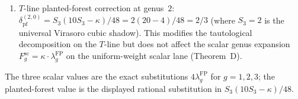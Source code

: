 \begin{computation}
\begin{enumerate}[label=\textup{(\roman*)}]
 tree-level and one-loop amplitudes explicitly.
\item $T$-line planted-forest correction at genus~$2$:
 $\delta_{\mathrm{pf}}^{(2,0)} = S_3(10S_3 - \kappa)/48
 = 2(20 - 4)/48 = 2/3$
 \textup{(}where $S_3 = 2$ is the universal Virasoro
 cubic shadow\textup{)}.
 This modifies the tautological decomposition on the
 $T$-line but does not affect the scalar genus expansion
 $F_g^{\mathrm{sc}} = \kappa \cdot \lambda_g^{\mathrm{FP}}$ on the
 uniform-weight scalar lane
 \textup{(}Theorem~D\textup{)}.
\end{enumerate}
The three scalar values are the exact substitutions
$4\lambda_g^{\mathrm{FP}}$ for $g=1,2,3$; the planted-forest value is
the displayed rational substitution in $S_3(10S_3-\kappa)/48$.
\end{computation}

